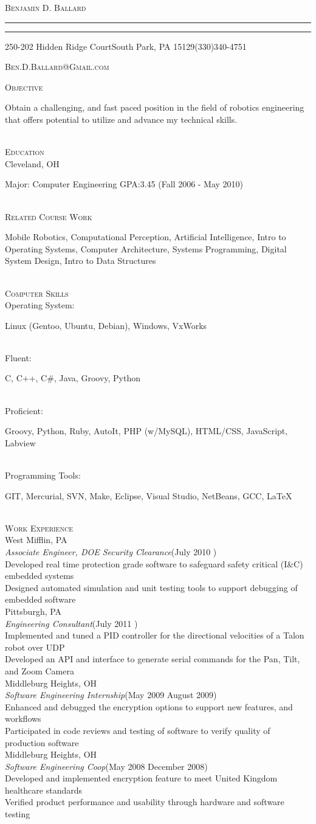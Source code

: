 \documentclass[11pt,letterpaper]{article}
\makeatletter
\newcommand{\name}{\textsc{Benjamin D. Ballard}}
\newcommand{\address}{\footnotesize 250-202 Hidden Ridge Court\hspace{2px}\textbullet\hspace{2px}South Park, PA 15129\hspace{2px}\textbullet\hspace{2px}(330)340-4751}
\newcommand{\email}{\textsc{Ben.D.Ballard@Gmail.com}}
\newcommand{\SkillItem}[2]{\hspace*{.5in}#1\hfill\begin{minipage}[t]{5.5in} #2 \end{minipage}\\}
\newcommand{\SectionHeader}[1]{\textsc{#1} \vspace{-2px}\\}
\newcommand{\CollegeHeader}[2]{\hspace*{.52in}{\bf#1} \hfill #2 \\}
\newcommand{\CompanyHeader}[4]{\hspace*{.52in}{\bf#1} \hfill #2 \\\hspace*{.5in}\emph{#3}\hfill (#4) \\}
\newcommand{\ResumeItem}[1]{\hspace*{.5in}\textopenbullet\hspace*{.2in}#1\\}
\newcommand{\TextBlock}[1]
{\hspace*{.5in} \begin{minipage}[t]{\textwidth -.5in} #1 \end{minipage}\\}
\newcommand{\ResumeHeader}{
\begin{center}
{

\linespread{0}

\Huge{\textsc{\name}}

\small
\nointerlineskip \vspace{4px}%
  \hspace{\fill}
\rule{\textwidth}{1px}
 \par\nointerlineskip \vspace{\baselineskip}
\nointerlineskip \vspace{0px}%
  \hspace{\fill}
\rule{\textwidth}{1px}
 \par \nointerlineskip \vspace{1px}
 \address \par \nointerlineskip \vspace{\baselineskip}
 \email
}
\end{center}
}
\makeatother
\begin{document}
\ResumeHeader
\vspace{-15px}

\SectionHeader{Objective}
\TextBlock{Obtain a challenging, and fast paced position in the field of robotics engineering that offers potential to utilize and advance my technical skills.}
\SectionHeader{Education}
\CollegeHeader{Case Western Reserve University}{Cleveland, OH}
\TextBlock{Major: Computer Engineering GPA:3.45 \hfill (Fall 2006 - May 2010)}
\SectionHeader{Related Course Work}
\TextBlock{Mobile Robotics, Computational Perception, Artificial Intelligence, Intro to Operating Systems, Computer Architecture, Systems Programming, Digital System Design, Intro to Data Structures}
\SectionHeader{Computer Skills}
\SkillItem{Operating System:}{Linux (Gentoo, Ubuntu, Debian), Windows, VxWorks}
\SkillItem{Fluent:}{C, C++, C\#, Java, Groovy, Python}
\SkillItem{Proficient:}{Groovy, Python, Ruby, AutoIt, PHP (w/MySQL), HTML/CSS, JavaScript, Labview}
\SkillItem{Programming Tools:}{GIT, Mercurial, SVN, Make, Eclipse, Visual Studio, NetBeans, GCC, \LaTeX}
\SectionHeader{Work Experience}
\CompanyHeader{Bechtel Marine Propulsion Company (Bettis Atomic Power Laboratory)}{West Mifflin, PA}{Associate Engineer, DOE Security Clearance}{July 2010 \textendash { Present}}
\ResumeItem{Developed real time protection grade software to safeguard safety critical (I\&{C}) embedded systems}
\ResumeItem{Designed automated simulation and unit testing tools to support debugging of embedded software}
\CompanyHeader{Carnegie Robotics}{Pittsburgh, PA}{Engineering Consultant}{July 2011 \textendash { August 2011}}
\ResumeItem{Implemented and tuned a PID controller for the directional velocities of a Talon robot over UDP}
\ResumeItem{Developed an API and interface to generate serial commands for the Pan, Tilt, and Zoom Camera}
\CompanyHeader{Codonics}{Middleburg Heights, OH}{Software Engineering Internship}{May 2009 \textendash
 { }August 2009}
 \ResumeItem{Enhanced and debugged the encryption options to support new features, and workflows}
 \ResumeItem{Participated in code reviews and testing of software to verify quality of production software}
 \CompanyHeader{Codonics}{Middleburg Heights, OH}{Software Engineering Coop}{May 2008 \textendash
 { }December 2008}
 \ResumeItem{Developed and implemented encryption feature to meet United Kingdom healthcare standards}
 \ResumeItem{Verified product performance and usability through hardware and software testing}
\end{document}
